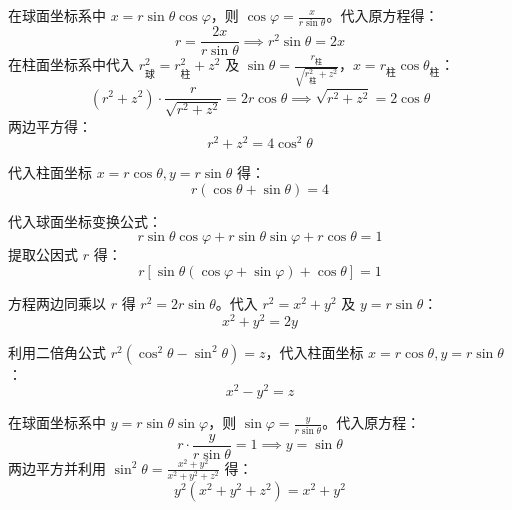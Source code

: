 \begin{solution}
    在球面坐标系中 $x = r \sin \theta \cos \varphi$，则 $\cos \varphi = \frac{x}{r \sin \theta}$。代入原方程得：
    \begin{equation}
        r = \frac{2x}{r \sin \theta} \implies r^2 \sin \theta = 2x
    \end{equation}
    在柱面坐标系中代入 $r_{\text{球}}^2 = r_{\text{柱}}^2 + z^2$ 及 $\sin \theta = \frac{r_{\text{柱}}}{\sqrt{r_{\text{柱}}^2 + z^2}}$，$x = r_{\text{柱}} \cos \theta_{\text{柱}}$：
    \begin{equation}
        (r^2 + z^2) \cdot \frac{r}{\sqrt{r^2 + z^2}} = 2r \cos \theta \implies \sqrt{r^2 + z^2} = 2 \cos \theta
    \end{equation}
    两边平方得：
    \begin{equation}
        \boxed{r^2 + z^2 = 4\cos^2 \theta}
    \end{equation}

    代入柱面坐标 $x = r \cos \theta, y = r \sin \theta$ 得：
    \begin{equation}
        \boxed{r (\cos \theta + \sin \theta) = 4}
    \end{equation}

    代入球面坐标变换公式：
    \begin{equation}
        r \sin \theta \cos \varphi + r \sin \theta \sin \varphi + r \cos \theta = 1
    \end{equation}
    提取公因式 $r$ 得：
    \begin{equation}
        \boxed{r [\sin \theta (\cos \varphi + \sin \varphi) + \cos \theta] = 1}
    \end{equation}

    方程两边同乘以 $r$ 得 $r^2 = 2r \sin \theta$。代入 $r^2 = x^2 + y^2$ 及 $y = r \sin \theta$：
    \begin{equation}
        \boxed{x^2 + y^2 = 2y}
    \end{equation}

    利用二倍角公式 $r^2 (\cos^2 \theta - \sin^2 \theta) = z$，代入柱面坐标 $x = r \cos \theta, y = r \sin \theta$：
    \begin{equation}
        \boxed{x^2 - y^2 = z}
    \end{equation}

    在球面坐标系中 $y = r \sin \theta \sin \varphi$，则 $\sin \varphi = \frac{y}{r \sin \theta}$。代入原方程：
    \begin{equation}
        r \cdot \frac{y}{r \sin \theta} = 1 \implies y = \sin \theta
    \end{equation}
    两边平方并利用 $\sin^2 \theta = \frac{x^2 + y^2}{x^2 + y^2 + z^2}$ 得：
    \begin{equation}
        \boxed{y^2 (x^2 + y^2 + z^2) = x^2 + y^2}
    \end{equation}
\end{solution}


